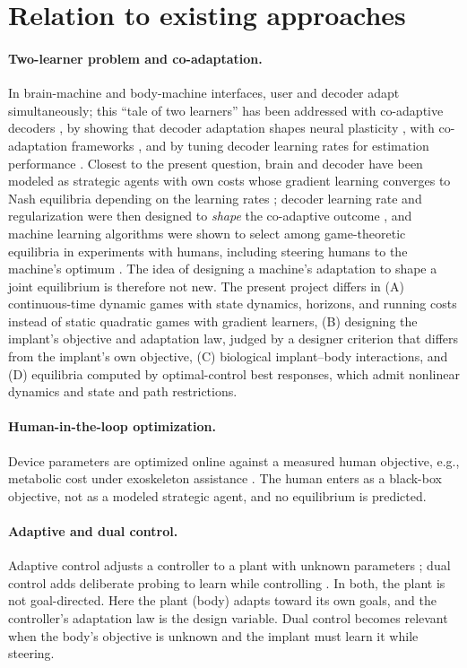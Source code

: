 \documentclass[11pt,a4paper]{article}
\begin{document}
\section{Relation to existing approaches}

\paragraph{Two-learner problem and co-adaptation.}
In brain-machine and body-machine interfaces, user and decoder adapt simultaneously;
this ``tale of two learners'' \citep{PerdikisMillan2020} has been addressed with
co-adaptive decoders \citep{DiGiovanna2009}, by showing that decoder adaptation shapes
neural plasticity \citep{Orsborn2014}, with co-adaptation frameworks \citep{DeSantis2021},
and by tuning decoder learning rates for estimation performance \citep{HsiehShanechi2018}.
Closest to the present question, brain and decoder have been modeled as strategic agents
with own costs whose gradient learning converges to Nash equilibria depending on the
learning rates \citep{Madduri2021}; decoder learning rate and regularization were then
designed to \emph{shape} the co-adaptive outcome \citep{Madduri2024}, and machine learning
algorithms were shown to select among game-theoretic equilibria in experiments with
humans, including steering humans to the machine's optimum \citep{Chasnov2025}.
The idea of designing a machine's adaptation to shape a joint equilibrium is therefore not
new. The present project differs in (A) continuous-time dynamic games with state
dynamics, horizons, and running costs instead of static quadratic games with gradient
learners, (B) designing the implant's objective and adaptation law, judged by a designer
criterion that differs from the implant's own objective, (C) biological implant--body
interactions, and (D) equilibria computed by optimal-control best responses, which admit
nonlinear dynamics and state and path restrictions.

\paragraph{Human-in-the-loop optimization.}
Device parameters are optimized online against a measured human objective, e.g.,
metabolic cost under exoskeleton assistance \citep{Zhang2017}. The human enters as a
black-box objective, not as a modeled strategic agent, and no equilibrium is predicted.

\paragraph{Adaptive and dual control.}
Adaptive control adjusts a controller to a plant with unknown parameters
\citep{AstromWittenmark1995}; dual control adds deliberate probing to learn while
controlling \citep{Feldbaum1960,Wittenmark1995}. In both, the plant is not goal-directed.
Here the plant (body) adapts toward its own goals, and the controller's adaptation law is
the design variable. Dual control becomes relevant when the body's objective is unknown
and the implant must learn it while steering.
\end{document}

